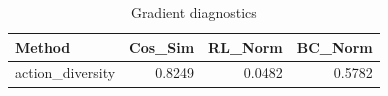 \begin{table}[htbp]
\centering
\caption{Gradient diagnostics}
\label{tab:grad-diag}
\begin{tabular}{lrrr}
\toprule
\textbf{Method} & \textbf{Cos\_Sim} & \textbf{RL\_Norm} & \textbf{BC\_Norm} \\
\midrule
action\_diversity & 0.8249 & 0.0482 & 0.5782 \\
\bottomrule
\end{tabular}
\end{table}
